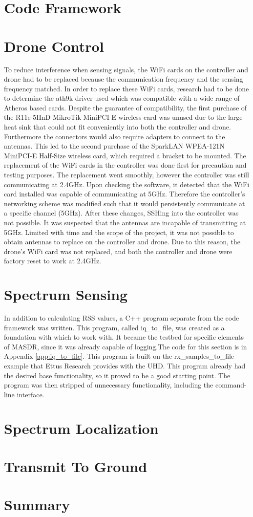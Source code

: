 \section{Code Framework}
\section{Drone Control}
To reduce interference when sensing signals, the WiFi cards on the controller and drone had to be replaced because the communication frequency and the sensing frequency matched. In order to replace these WiFi cards, research had to be done to determine the ath9k driver used which was compatible with a wide range of Atheros based cards. Despite the guarantee of compatibility, the first purchase of the R11e-5HnD MikroTik MiniPCI-E wireless card was unused due to the large heat sink that could not fit conveniently into both the controller and drone. Furthermore the connectors would also require adapters to connect to the antennas. This led to the second purchase of the SparkLAN WPEA-121N MiniPCI-E Half-Size wireless card, which required a bracket to be mounted. The replacement of the WiFi cards in the controller was done first for precaution and testing purposes. The replacement went smoothly, however the controller was still communicating at 2.4GHz. Upon checking the software, it detected that the WiFi card installed was capable of communicating at 5GHz. Therefore the controller's networking scheme was modified such that it would persistently communicate at a specific channel (5GHz). After these changes, SSHing into the controller was not possible. It was suspected that the antennas are incapable of transmitting at 5GHz. Limited with time and the scope of the project, it was not possible to obtain antennas to replace on the controller and drone. Due to this reason, the drone's WiFi card was not replaced, and both the controller and drone were factory reset to work at 2.4GHz.
\section{Spectrum Sensing}
In addition to calculating RSS values, a C++ program separate from the code framework
was written. This program, called iq\_to\_file, was created as a foundation with 
which to work with. It became the testbed for specific elements of MASDR, since it
was already capable of logging.The code for this section is in Appendix \ref{app:iq_to_file}. 
This program is built on the rx_samples_to_file example that Ettus Research provides 
with the UHD. This program already had the desired base functionality, so it proved
to be a good starting point. The program was then stripped of unnecessary functionality,
including the command-line interface. \par

\section{Spectrum Localization}
\section{Transmit To Ground}
\section{Summary}
